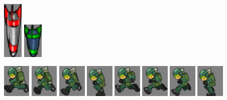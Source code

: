 \documentclass[10pt]{book}
\begin{document}
\begin{center}
\includegraphics[width=0.07\textwidth]{previews/nightstrike_0-MISSILE_A-00.png}
\includegraphics[width=0.07\textwidth]{previews/nightstrike_0-MISSILE_C-00.png}
\end{center}

\begin{center}
\includegraphics[width=0.1\textwidth]{previews/nightstrike_0-SOLDIER_RUN-00.png}
\includegraphics[width=0.1\textwidth]{previews/nightstrike_0-SOLDIER_RUN-01.png}
\includegraphics[width=0.1\textwidth]{previews/nightstrike_0-SOLDIER_RUN-02.png}
\includegraphics[width=0.1\textwidth]{previews/nightstrike_0-SOLDIER_RUN-03.png}
\includegraphics[width=0.1\textwidth]{previews/nightstrike_0-SOLDIER_RUN-04.png}
\includegraphics[width=0.1\textwidth]{previews/nightstrike_0-SOLDIER_RUN-05.png}
\includegraphics[width=0.1\textwidth]{previews/nightstrike_0-SOLDIER_RUN-06.png}
\includegraphics[width=0.1\textwidth]{previews/nightstrike_0-SOLDIER_RUN-07.png}
\end{center}
\end{document}
